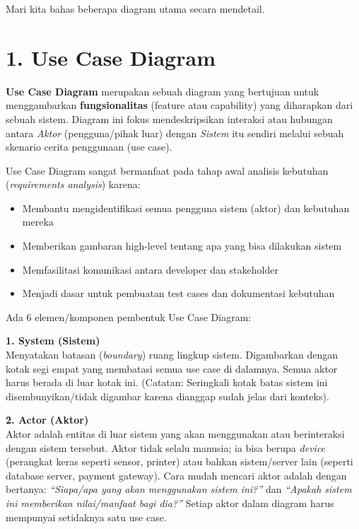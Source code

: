 \documentclass[12pt,a4paper]{article}
\begin{document}
Mari kita bahas beberapa diagram utama secara mendetail.

\newpage
\section{1. Use Case Diagram}

\textbf{Use Case Diagram} merupakan sebuah diagram yang bertujuan untuk menggambarkan \textbf{fungsionalitas} (feature atau capability) yang diharapkan dari sebuah sistem. Diagram ini fokus mendeskripsikan interaksi atau hubungan antara \textit{Aktor} (pengguna/pihak luar) dengan \textit{Sistem} itu sendiri melalui sebuah skenario cerita penggunaan (use case).

Use Case Diagram sangat bermanfaat pada tahap awal analisis kebutuhan (\textit{requirements analysis}) karena:
\begin{itemize}
    \item Membantu mengidentifikasi semua pengguna sistem (aktor) dan kebutuhan mereka
    \item Memberikan gambaran high-level tentang apa yang bisa dilakukan sistem
    \item Memfasilitasi komunikasi antara developer dan stakeholder
    \item Menjadi dasar untuk pembuatan test cases dan dokumentasi kebutuhan
\end{itemize}

Ada 6 elemen/komponen pembentuk Use Case Diagram:

\textbf{1. System (Sistem)}\\
Menyatakan batasan (\textit{boundary}) ruang lingkup sistem. Digambarkan dengan kotak segi empat yang membatasi semua use case di dalamnya. Semua aktor harus berada di luar kotak ini. (Catatan: Seringkali kotak batas sistem ini disembunyikan/tidak digambar karena dianggap sudah jelas dari konteks).

\textbf{2. Actor (Aktor)}\\
Aktor adalah entitas di luar sistem yang akan menggunakan atau berinteraksi dengan sistem tersebut. Aktor tidak selalu manusia; ia bisa berupa \textit{device} (perangkat keras seperti sensor, printer) atau bahkan sistem/server lain (seperti database server, payment gateway). Cara mudah mencari aktor adalah dengan bertanya: \textit{``Siapa/apa yang akan menggunakan sistem ini?''} dan \textit{``Apakah sistem ini memberikan nilai/manfaat bagi dia?''} Setiap aktor dalam diagram harus mempunyai setidaknya satu use case.
\end{document}

